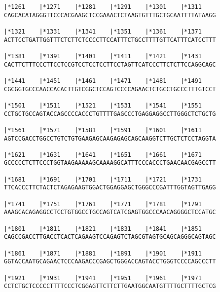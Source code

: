 \documentclass{article}
\begin{document}
\begin{Verbatim}
|*1261    |*1271    |*1281    |*1291    |*1301    |*1311    
CAGCACATAGGGTTCCCACGAAGCTCCGAAACTCTAAGTGTTTGCTGCAATTTTATAAGG
                                                            
|*1321    |*1331    |*1341    |*1351    |*1361    |*1371    
ACTTCCTGATTGGTTTCTCTTCTCCCCTTCCATTTCTGCCTTTTGTTCATTTCATCCTTT
                                                            
|*1381    |*1391    |*1401    |*1411    |*1421    |*1431    
CACTTCTTTCCCTTCCTCCGTCCTCCTCCTTCCTAGTTCATCCCTTCTCTTCCAGGCAGC
                                                            
|*1441    |*1451    |*1461    |*1471    |*1481    |*1491    
CGCGGTGCCCAACCACACTTGTCGGCTCCAGTCCCCAGAACTCTGCCTGCCCTTTGTCCT
                                                            
|*1501    |*1511    |*1521    |*1531    |*1541    |*1551    
CCTGCTGCCAGTACCAGCCCCACCCTGTTTTGAGCCCTGAGGAGGCCTTGGGCTCTGCTG
                                                            
|*1561    |*1571    |*1581    |*1591    |*1601    |*1611    
AGTCCGACCTGGCCTGTCTGTGAAGAGCAAGAGAGCAGCAAGGTCTTGCTCTCCTAGGTA
                                                            
|*1621    |*1631    |*1641    |*1651    |*1661    |*1671    
GCCCCCTCTTCCCTGGTAAGAAAAAGCAAAAGGCATTTCCCACCCTGAACAACGAGCCTT
                                                            
|*1681    |*1691    |*1701    |*1711    |*1721    |*1731    
TTCACCCTTCTACTCTAGAGAAGTGGACTGGAGGAGCTGGGCCCGATTTGGTAGTTGAGG
                                                            
|*1741    |*1751    |*1761    |*1771    |*1781    |*1791    
AAAGCACAGAGGCCTCCTGTGGCCTGCCAGTCATCGAGTGGCCCAACAGGGGCTCCATGC
                                                            
|*1801    |*1811    |*1821    |*1831    |*1841    |*1851    
CAGCCGACCTTGACCTCACTCAGAAGTCCAGAGTCTAGCGTAGTGCAGCAGGGCAGTAGC
                                                            
|*1861    |*1871    |*1881    |*1891    |*1901    |*1911    
GGTACCAATGCAGAACTCCCAAGACCCGAGCTGGGACCAGTACCTGGGTCCCCAGCCCTT
                                                            
|*1921    |*1931    |*1941    |*1951    |*1961    |*1971    
CCTCTGCTCCCCCTTTTCCCTCGGAGTTCTTCTTGAATGGCAATGTTTTGCTTTTGCTCG
                                                            

\end{Verbatim}
\end{document}
